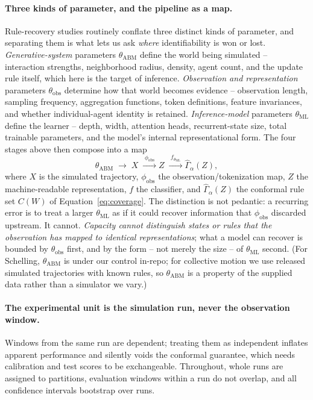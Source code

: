 \documentclass[11pt]{article}
\begin{document}
\paragraph{Three kinds of parameter, and the pipeline as a map.}
Rule-recovery studies routinely conflate three distinct kinds of parameter, and
separating them is what lets us ask \emph{where} identifiability is won or lost.
\emph{Generative-system} parameters $\theta_{\mathrm{ABM}}$ define the world being
simulated -- interaction strengths, neighborhood radius, density, agent count, and the
update rule itself, which here is the target of inference. \emph{Observation and
representation} parameters $\theta_{\mathrm{obs}}$ determine how that world becomes
evidence -- observation length, sampling frequency, aggregation functions, token
definitions, feature invariances, and whether individual-agent identity is retained.
\emph{Inference-model} parameters $\theta_{\mathrm{ML}}$ define the learner -- depth,
width, attention heads, recurrent-state size, total trainable parameters, and the
model's internal representational form. The four stages above then compose into a map
%
\begin{equation}
\theta_{\mathrm{ABM}} \;\longrightarrow\; X
  \;\xrightarrow{\;\phi_{\mathrm{obs}}\;} Z
  \;\xrightarrow{\;f_{\theta_{\mathrm{ML}}}\;} \widehat{\Gamma}_{\alpha}(Z),
\label{eq:pipeline}
\end{equation}
%
where $X$ is the simulated trajectory, $\phi_{\mathrm{obs}}$ the
observation/tokenization map, $Z$ the machine-readable representation, $f$ the
classifier, and $\widehat{\Gamma}_{\alpha}(Z)$ the conformal rule set $C(W)$ of
Equation~\ref{eq:coverage}. The distinction is not pedantic: a recurring error is to
treat a larger $\theta_{\mathrm{ML}}$ as if it could recover information that
$\phi_{\mathrm{obs}}$ discarded upstream. It cannot. \emph{Capacity cannot distinguish
states or rules that the observation has mapped to identical representations}; what a
model can recover is bounded by $\theta_{\mathrm{obs}}$ first, and by the form -- not
merely the size -- of $\theta_{\mathrm{ML}}$ second. (For Schelling, $\theta_{\mathrm{ABM}}$
is under our control in-repo; for collective motion we use released simulated
trajectories with known rules, so $\theta_{\mathrm{ABM}}$ is a property of the supplied
data rather than a simulator we vary.)

\paragraph{The experimental unit is the simulation run, never the observation
window.} Windows from the same run are dependent; treating them as independent
inflates apparent performance and silently voids the conformal guarantee, which needs
calibration and test scores to be exchangeable. Throughout, whole runs are assigned
to partitions, evaluation windows within a run do not overlap, and all confidence
intervals bootstrap over runs.
\end{document}
